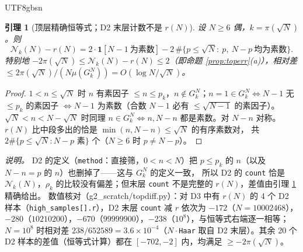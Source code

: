 \documentclass[11pt,a4paper]{article}
\newcommand{\Haar}{\mu}
\newcommand{\status}[1]{\par\noindent\fbox{\textbf{状态：#1}}\par\smallskip}
\newcommand{\Cnt}{\mathcal N}          %
\theoremstyle{plain}
\newtheorem{lem}[prop]{引理}
\theoremstyle{definition}
\begin{document}
\begin{CJK}{UTF8}{gbsn}
\begin{lem}[顶层精确恒等式；D2 末层计数不是 $r(N)$]\label{lem:topexact}
设 $N\ge6$ 偶，$k=\pi(\sqrt N)$。则
\[
\Cnt_k(N)-r(N)=2\cdot\mathbf 1[N-1\ \text{为素数}]-2\,\#\{p\le\sqrt N:\ p,\ N-p\ \text{均为素数}\}.
\]
特别地 $-2\pi(\sqrt N)\le\Cnt_k(N)-r(N)\le2$（即命题 \ref{prop:toperr}(a)），相对差 $\le2\pi(\sqrt N)/(N\Haar(G_k^N))=O(\log N/\sqrt N)$。
\end{lem}
\status{已证}
\begin{proof}
$1<n\le\sqrt N$ 时 $n$ 有素因子 $\le n\le p_k$，$n\notin G_k^N$；$n=1\in G_k^N\iff N-1$ 无 $\le p_k$ 的素因子 $\iff N-1$ 为素数（合数 $N-1$ 必有 $\le\sqrt{N-1}$ 的素因子）。
$\sqrt N<n<N-\sqrt N$ 时同理 $n\in G_k^N\iff n,N-n$ 都是素数。对 $N-n$ 对称。$r(N)$ 比中段多出的恰是 $\min(n,N-n)\le\sqrt N$ 的有序素数对，
共 $2\#\{p\le\sqrt N:N-p\text{ 素}\}$ 个（$N\ge6$ 时 $p\ne N-p$）。
\end{proof}
\emph{说明。} D2 的定义（\texttt{method}：直接筛，$0<n<N$）把 $p\le p_k$ 的 $n$（以及 $N-n=p$ 的 $n$）也删掉了——这与 $G_k^N$ 的定义一致，
所以 D2 的 \texttt{count} 恰是 $\Cnt_k(N)$，$\rho_k$ 的比较没有偏差；但末层 \texttt{count} 不是完整的 $r(N)$，差值由引理 \ref{lem:topexact} 精确给出。
数值核对（g2\_scratch/topdiff.py）：对 D3 中有 $r(N)$ 的 4 个 D2 样本（\texttt{high\_samples[].r}），D2 末层 \texttt{count} 减 $r$ 依次为
$-172$（$N=10002468$），$-280$（$10210200$），$-670$（$99999900$），$-238$（$10^8$），与恒等式右端逐一相等；
$N=10^8$ 时相对差 $238/652589=3.6\times10^{-4}$（$N\cdot$\texttt{Haar} 取自 D2 末层）。其余 20 个 D2 样本的差值（恒等式计算）都在 $[-702,-2]$ 内，均满足 $\ge-2\pi(\sqrt N)$。


\end{CJK}
\end{document}

